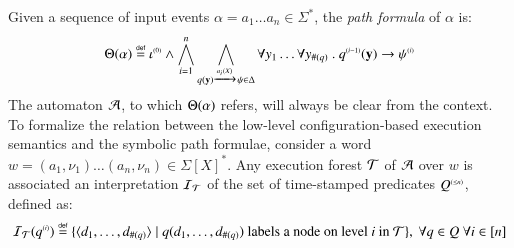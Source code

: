 Given a sequence of input events $\alpha = a_1 \ldots a_n \in
\Sigma^*$, the \emph{path formula} of $\alpha$ is:
\begin{equation}\label{eq:pathform}
\Theta({\alpha}) \stackrel{\scriptscriptstyle{\mathsf{def}}}{=} {\iota}^{\scriptscriptstyle{({0})}} \wedge 
\bigwedge_{i=1}^n \bigwedge_{q(\mathbf y) \xrightarrow{{\scriptscriptstyle a_i(X)}}_{{\scriptstyle }}
  \psi \in \Delta} \forall y_1 \ldots \forall y_{\#(q)} ~.~
{q}^{\scriptscriptstyle{({i-1})}}(\mathbf y) \rightarrow {\psi}^{\scriptscriptstyle{({i})}}
\end{equation}
The automaton $\mathcal{A}$, to which $\Theta({\alpha})$ refers, will always
be clear from the context. To formalize the relation between the
low-level configuration-based execution semantics and the symbolic
path formulae, consider a word $w=(a_1,\nu_1) \ldots (a_n,\nu_n) \in
\Sigma[X]^*$. Any execution forest $\mathcal{T}$ of $\mathcal{A}$ over $w$ is associated
an interpretation $\mathcal{I}_{\mathcal{T}}$ of the set of time-stamped predicates
${Q}^{\scriptscriptstyle{({\leq n})}}$, defined as:
\[\mathcal{I}_{\mathcal{T}}({q}^{\scriptscriptstyle{({i})}}) \stackrel{\scriptscriptstyle{\mathsf{def}}}{=} \{ \langle d_1,\ldots,d_{\#(q)} \rangle \mid
  q(d_1,\ldots,d_{\#(q)}) \text{ labels a node on level $i$ in $\mathcal{T}$} \} 
,~\forall q\in Q ~\forall i \in [n]\]

